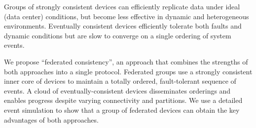 Groups of strongly consistent devices can efficiently replicate data under
ideal (data center) conditions, but become less effective in dynamic and
heterogeneous environments.  Eventually consistent devices efficiently
tolerate both faults and dynamic conditions but are slow to converge on a
single ordering of system events.

We propose ``federated consistency'', an approach that combines the strengths
of both approaches into a single protocol. Federated groups use a strongly
consistent inner core of devices to maintain a totally ordered, fault-tolerant
sequence of events.  A cloud of eventually-consistent devices disseminates
orderings and enables progress despite varying connectivity and partitions.
We use a detailed event simulation to show that a group of federated devices
can obtain the key advantages of both approaches. 

